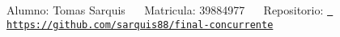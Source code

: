 Alumno\+: Tomas Sarquis~\newline
~\newline
Matricula\+: 39884977~\newline
~\newline
Repositorio\+: \href{https://github.com/sarquis88/final-concurrente}{\texttt{ https\+://github.\+com/sarquis88/final-\/concurrente}} 